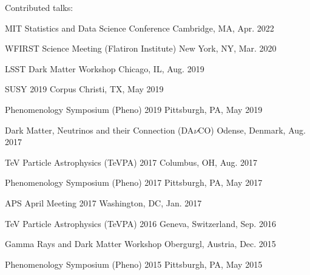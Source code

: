 \documentclass[letterpaper,11pt]{article}
\newenvironment{packed_itemize}{
\begin{itemize}[label=\raisebox{0.25ex}{\tiny$\bullet$}]
  \setlength{\itemsep}{3.9pt}
  \setlength{\parskip}{0pt}
  \setlength{\parsep}{0pt}}{\end{itemize}
}
\begin{document}
\noindent
Contributed talks:
\begin{packed_itemize}
  \item MIT Statistics and Data Science Conference  \hfill Cambridge, MA, Apr. 2022
  \item WFIRST Science Meeting (Flatiron Institute) \hfill New York, NY, Mar. 2020
  \item LSST Dark Matter Workshop \hfill Chicago, IL, Aug. 2019
  \item SUSY 2019 \hfill Corpus Christi, TX, May 2019
  \item Phenomenology Symposium (Pheno) 2019 \hfill Pittsburgh, PA, May 2019
  \item Dark Matter, Neutrinos and their Connection (DA$\nu$CO) \hfill Odense, Denmark, Aug. 2017
  \item TeV Particle Astrophysics (TeVPA) 2017 \hfill Columbus, OH, Aug. 2017 
  \item Phenomenology Symposium (Pheno) 2017 \hfill Pittsburgh, PA, May 2017 
  \item APS April Meeting 2017 \hfill Washington, DC, Jan. 2017 
  \item TeV Particle Astrophysics (TeVPA) 2016 \hfill Geneva, Switzerland, Sep. 2016 
  \item Gamma Rays and Dark Matter Workshop \hfill Obergurgl, Austria, Dec. 2015
  \item Phenomenology Symposium (Pheno) 2015 \hfill Pittsburgh, PA, May 2015
\end{packed_itemize}
\vspace{2.0mm}


\end{document}

